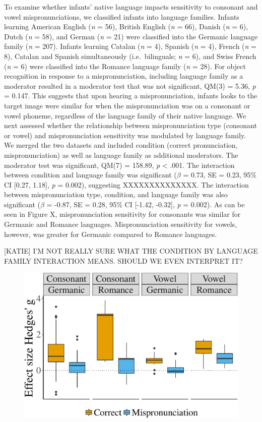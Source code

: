 \documentclass[man]{apa6}
\theoremstyle{definition}
\theoremstyle{definition}
\theoremstyle{definition}
\theoremstyle{remark}
\begin{document}
To examine whether infants' native language impacts sensitivity to
consonant and vowel mispronunciations, we classified infants into
language families. Infants learning American English (\emph{n} = 56),
British English (\emph{n} = 66), Danish (\emph{n} = 6), Dutch (\emph{n}
= 58), and German (\emph{n} = 21) were classified into the Germanic
language family (\emph{n} = 207). Infants learning Catalan (\emph{n} =
4), Spanish (\emph{n} = 4), French (\emph{n} = 8), Catalan and Spanish
simultaneously (i.e.~bilinguals; \emph{n} = 6), and Swiss French
(\emph{n} = 6) were classified into the Romance language family
(\emph{n} = 28). For object recognition in response to a
mispronunciation, including language family as a moderator resulted in a
moderator test that was not significant, QM(3) = 5.36, \emph{p} = 0.147.
This suggests that upon hearing a mispronunciation, infants looks to the
target image were similar for when the mispronunciation was on a
consonant or vowel phoneme, regardless of the language family of their
native language. We next assessed whether the relationship between
mispronunciation type (consonant or vowel) and mispronunciation
sensitivity was modulated by language family. We merged the two datasets
and included condition (correct pronunciation, mispronunciation) as well
as language family as additional moderators. The moderator test was
significant, QM(7) = 158.89, \emph{p} \textless{} .001. The interaction
between condition and language family was significant (\(\beta\) = 0.73,
SE = 0.23, 95\% CI {[}0.27, 1.18{]}, \emph{p} = 0.002), suggesting
XXXXXXXXXXXXXX. The interaction between mispronunciation type,
condition, and language family was also significant (\(\beta\) = -0.87,
SE = 0.28, 95\% CI {[}-1.42, -0.32{]}, \emph{p} = 0.002). As can be seen
in Figure X, mispronunciation sensitivity for consonants was similar for
Germanic and Romance languages. Mispronunciation sensitivity for vowels,
however, was greater for Germanic compared to Romance languages.

{[}KATIE{]} I'M NOT REALLY SURE WHAT THE CONDITION BY LANGUAGE FAMILY
INTERACTION MEANS. SHOULD WE EVEN INTERPRET IT?

\begin{figure}[htbp]
\centering
\includegraphics{Paper_Analyses_files/figure-latex/PlotCVEffect_Lang-1.pdf}
\caption{}
\end{figure}
\end{document}
